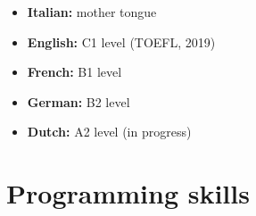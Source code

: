\documentclass[10pt, a4paper, roman]{moderncv}        %
\begin{document}
	\begin{itemize}
		
		\item \textbf{Italian:} mother tongue
		
		\vspace{1pt}
		
		\item \textbf{English:} C1 level (TOEFL, 2019)
		
		\vspace{1pt}
		
		\item \textbf{French:} B1 level
		
		\vspace{1pt}
		
		\item \textbf{German:} B2 level
		
		\vspace{1pt}
		
		\item \textbf{Dutch:} A2 level (in progress)
		
	\end{itemize}
	
	\vspace{2pt}
	
	\section{Programming skills}
	
	\vspace{1pt}
	
\end{document}
